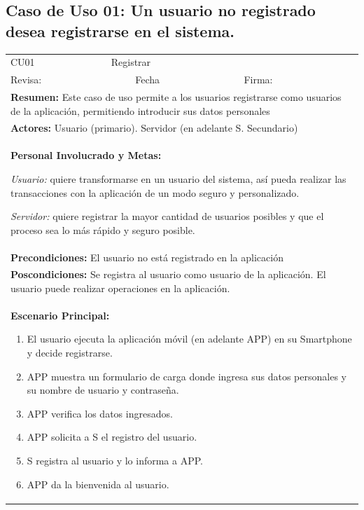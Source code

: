 		\subsection{Caso de Uso 01: Un usuario no registrado desea registrarse en el sistema.}
			\begin{longtable}{|l|p{5.5cm}|l|p{2cm}|l|p{1.9cm}|} \hline
					\cellcolor{grisOscuro} CU01 & \multicolumn{4}{|l|}{  \cellcolor{grisOscuro} Registrar} &  \cellcolor{grisClaro}\multirow{2}{1cm}{} \\ \cline{1-5}
					\cellcolor{grisOscuro} Revisa: &  \cellcolor{grisClaro} &  \cellcolor{grisOscuro} Fecha &  \cellcolor{grisClaro} &  \cellcolor{grisOscuro} Firma: & \cellcolor{grisClaro} \\ \hline
					\multicolumn{6}{|p{15cm}|}{ \textbf{Resumen: } Este caso de uso permite a los usuarios registrarse como usuarios de la aplicación, permitiendo introducir sus datos personales

					} \\ \hline

					\multicolumn{6}{|p{15cm}|}{ \textbf{Actores: } Usuario (primario). Servidor (en adelante S. Secundario)

					} \\ \hline

					\multicolumn{6}{|p{15cm}|}{ \textbf{Personal Involucrado y Metas: }
					
					\emph{Usuario:} quiere transformarse en un usuario del sistema, así pueda realizar las transacciones con la aplicación de un modo seguro y personalizado.
					
					\emph{Servidor: } quiere registrar la mayor cantidad de usuarios posibles y que el proceso sea lo más rápido y seguro posible.
					} \\ \hline

					\multicolumn{6}{|p{15cm}|}{ \textbf{Precondiciones: } El usuario no está registrado en la aplicación

					} \\ \hline

					\multicolumn{6}{|p{15cm}|}{ \textbf{Poscondiciones: } Se registra al usuario como usuario de la aplicación. El usuario puede realizar operaciones en la aplicación.

					} \\ \hline

					\multicolumn{6}{|p{15cm}|}{ \textbf{Escenario Principal: }
							\begin{enumerate}
									\item El usuario ejecuta la aplicación móvil (en adelante APP) en su Smartphone y decide registrarse.
									\item APP muestra un formulario de carga donde ingresa sus datos personales y su nombre de usuario y contraseña.
									\item APP verifica los datos ingresados.
									\item APP solicita a S el registro del usuario.
									\item S registra al usuario y lo informa a APP.
									\item APP da la bienvenida al usuario.
							\end{enumerate}

}
\end{longtable}
